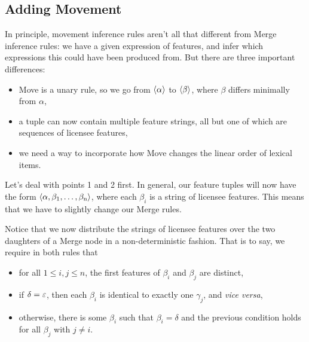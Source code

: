 \subsection{Adding Movement}
\label{sub:MG-TopDown_Movement}
In principle, movement inference rules aren't all that different from Merge inference rules: we have a given expression of features, and infer which expressions this could have been produced from.
But there are three important differences:
%
\begin{itemize}
    \item Move is a unary rule, so we go from $\ftuple{\alpha}$ to $\ftuple{\beta}$, where $\beta$ differs minimally from $\alpha$,
    \item a tuple can now contain multiple feature strings, all but one of which are sequences of licensee features,
    \item we need a way to incorporate how Move changes the linear order of lexical items.
\end{itemize}
%
Let's deal with points 1 and 2 first.
In general, our feature tuples will now have the form $\ftuple{\alpha, \beta_1, \ldots, \beta_n}$, where each $\beta_i$ is a string of licensee features.
This means that we have to slightly change our Merge rules.
%
\begin{prooftree}
\end{prooftree}
%
\begin{prooftree}
\end{prooftree}
%
Notice that we now distribute the strings of licensee features over the two daughters of a Merge node in a non-deterministic fashion.
That is to say, we require in both rules that
%
\begin{itemize}
    \item for all $1 \leq i, j \leq n$, the first features of $\beta_i$ and $\beta_j$ are distinct,
    \item if $\delta = \emptystring$, then each $\beta_i$ is identical to exactly one $\gamma_j$, and \emph{vice versa},
    \item otherwise, there is some $\beta_i$ such that $\beta_i = \delta$ and the previous condition holds for all $\beta_j$ with $j \neq i$.
\end{itemize}

